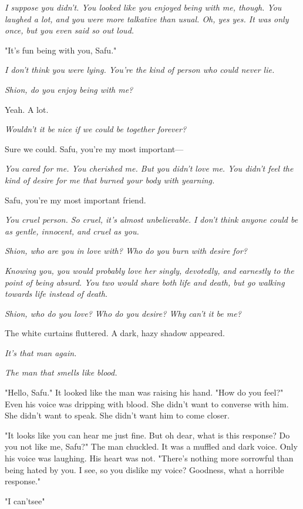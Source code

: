 \emph{I suppose you didn't. You looked like you enjoyed being with me, though.
You laughed a lot, and you were more talkative than usual. Oh, yes yes.
It was only once, but you even said so out loud.}

"It's fun being with you, Safu."

\emph{I don't think you were lying. You're the kind of person who could never
lie.}

\emph{Shion, do you enjoy being with me?}

Yeah. A lot.

\emph{Wouldn't it be nice if we could be together forever?}

Sure we could. Safu, you're my most important---

\emph{You cared for me. You cherished me. But you didn't love me. You didn't
feel the kind of desire for me that burned your body with yearning.}

Safu, you're my most important friend.

\emph{You cruel person. So cruel, it's almost unbelievable. I don't think
anyone could be as gentle, innocent, and cruel as you.}

\emph{Shion, who are you in love with? Who do you burn with desire for?}

\emph{Knowing you, you would probably love her singly, devotedly, and
earnestly to the point of being absurd. You two would share both life
and death, but go walking towards life instead of death.}

\emph{Shion, who do you love? Who do you desire? Why can't it be me?}

The white curtains fluttered. A dark, hazy shadow appeared.

\emph{It's that man again.}

\emph{The man that smells like blood.}

"Hello, Safu." It looked like the man was raising his hand. "How do you
feel?" Even his voice was dripping with blood. She didn't want to
converse with him. She didn't want to speak. She didn't want him to come
closer.

"It looks like you can hear me just fine. But oh dear, what is this
response? Do you not like me, Safu?" The man chuckled. It was a muffled
and dark voice. Only his voice was laughing. His heart was not. "There's
nothing more sorrowful than being hated by you. I see, so you dislike my
voice? Goodness, what a horrible response."

"I can't\el see\el "

